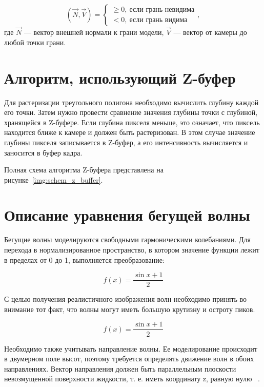 \begin{equation}
	(\overrightarrow{N}, \overrightarrow{V}) = \begin{cases}
		 \geq 0,~\text{если грань невидима} \\
		 < 0,~\text{если грань видима}
	\end{cases},
\end{equation}
где $\overrightarrow{N}$ --- вектор внешней нормали к грани модели, $\overrightarrow{V}$ --- вектор от камеры до любой точки грани.

\section{Алгоритм, использующий Z-буфер}

Для растеризации треугольного полигона необходимо вычислить глубину каждой его точки.  
Затем нужно провести сравнение значения глубины точки с глубиной, хранящейся в Z-буфере.  
Если глубина пикселя меньше, это означает, что пиксель находится ближе к камере и должен быть растеризован.  
В этом случае значение глубины пикселя записывается в Z-буфер, а его интенсивность вычисляется и заносится в буфер кадра.  

Полная схема алгоритма Z-буфера представлена на рисунке~\ref{img:schem_z_buffer}.



\newpage

\section{Описание уравнения бегущей волны}
Бегущие волны моделируются свободными гармоническими колебаниями. 
Для перехода в нормализированное пространство, в котором значение функции лежит в пределах от 0 до 1, 
выполняется преобразование:

\begin{equation}
    f(x) = \dfrac{\sin{x} + 1}{2}
\end{equation}

С целью получения реалистичного изображения волн необходимо принять во внимание тот факт, 
что волны могут иметь большую крутизну и остроту пиков.

\begin{equation}
    f(x) = \dfrac{\sin{x} + 1}{2}
\end{equation}

Необходимо также учитывать направление волны. Ее моделирование происходит в двумерном поле высот, 
поэтому требуется определять движение волн в обоих направлениях. Вектор направления должен быть 
параллельным плоскости невозмущенной поверхности жидкости, т. е. иметь координату z, равную нулю ~\cite{WAVE}.


